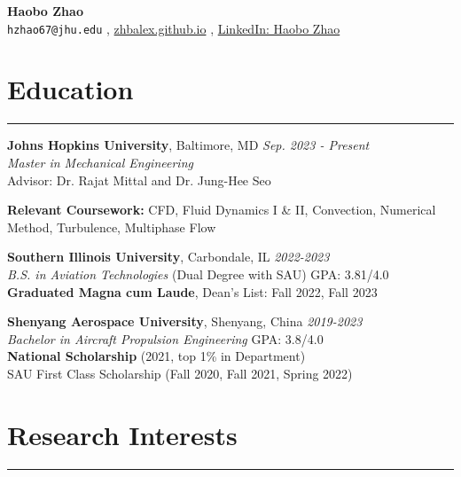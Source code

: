\documentclass[10pt]{article} %
\begin{document}
\small


\begin{center}
    {\LARGE \textbf{Haobo Zhao}} \\
    \vspace{2mm}
    \small
    \texttt{hzhao67@jhu.edu} ,
    \href{https://zhbalex.github.io}{zhbalex.github.io} ,
    \href{https://www.linkedin.com/in/haobo-zhao-035529229}{LinkedIn: Haobo Zhao}
\end{center}

\vspace{-8mm}

\section*{Education}
\hrule

\noindent\textbf{\normalsize{Johns Hopkins University}}, Baltimore, MD \hfill \textit{Sep. 2023 - Present} \\
\textsl{Master in Mechanical Engineering }\\
Advisor: Dr. Rajat Mittal and Dr. Jung-Hee Seo

\textbf{Relevant Coursework:} 
CFD, Fluid Dynamics I \& II, Convection, Numerical Method, Turbulence, Multiphase Flow
\vspace{2mm}

\noindent\textbf{\normalsize{Southern Illinois University}}, Carbondale, IL \hfill \textit{2022-2023} \\
\textsl{B.S. in Aviation Technologies} (Dual Degree with SAU) \hfill  GPA: 3.81/4.0 \\
\textbf{Graduated Magna cum Laude}, Dean's List: Fall 2022, Fall 2023

\vspace{2mm}

\noindent\textbf{\normalsize{Shenyang Aerospace University}}, Shenyang, China \hfill \textit{2019-2023} \\
\textsl{Bachelor in Aircraft Propulsion Engineering} \hfill GPA: 3.8/4.0 \\
\textbf{National Scholarship} (2021, top 1\% in Department) \\
SAU First Class Scholarship (Fall 2020, Fall 2021, Spring 2022)

\vspace{2mm}

\section*{Research Interests}
\hrule
\end{document}
